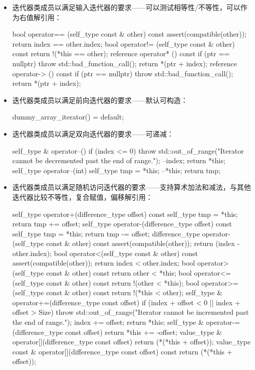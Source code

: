 \begin{itemize}
\item
迭代器类成员以满足输入迭代器的要求——可以测试相等性/不等性，可以作为右值解引用：

\begin{cpp}
bool operator== (self_type const & other) const
{
    assert(compatible(other));
    return index == other.index;
}
bool operator!= (self_type const & other) const
{
    return !(*this == other);
}
reference operator* () const
{
    if (ptr == nullptr)
    throw std::bad_function_call();
    return *(ptr + index);
}
reference operator-> () const
{
    if (ptr == nullptr)
    throw std::bad_function_call();
    return *(ptr + index);
}
\end{cpp}

\item
迭代器类成员以满足前向迭代器的要求——默认可构造：

\begin{cpp}
dummy_array_iterator() = default;
\end{cpp}

\item
迭代器类成员以满足双向迭代器的要求——可递减：

\begin{cpp}
self_type & operator--()
{
    if (index <= 0)
        throw std::out_of_range("Iterator cannot be decremented
                                 past the end of range.");
    --index;
    return *this;
}
self_type operator--(int)
{
    self_type tmp = *this;
    --*this;
    return tmp;
}
\end{cpp}

\item
迭代器类成员以满足随机访问迭代器的要求——支持算术加法和减法，与其他迭代器比较不等性，复合赋值，偏移解引用：

\begin{cpp}
self_type operator+(difference_type offset) const
{
    self_type tmp = *this;
    return tmp += offset;
}
self_type operator-(difference_type offset) const
{
    self_type tmp = *this;
    return tmp -= offset;
}
difference_type operator-(self_type const & other) const
{
    assert(compatible(other));
    return (index - other.index);
}
bool operator<(self_type const & other) const
{
    assert(compatible(other));
    return index < other.index;
}
bool operator>(self_type const & other) const
{
    return other < *this;
}
bool operator<=(self_type const & other) const
{
    return !(other < *this);
}
bool operator>=(self_type const & other) const
{
    return !(*this < other);
}
self_type & operator+=(difference_type const offset)
{
    if (index + offset < 0 || index + offset > Size)
        throw std::out_of_range("Iterator cannot be incremented
                                 past the end of range.");
    index += offset;
    return *this;
}
self_type & operator-=(difference_type const offset)
{
    return *this += -offset;
}
value_type & operator[](difference_type const offset)
{
    return (*(*this + offset));
}
value_type const & operator[](difference_type const offset)
const
{
    return (*(*this + offset));
}
\end{cpp}


\end{itemize}
